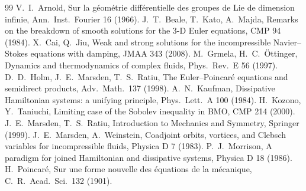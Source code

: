 \documentclass[11pt]{amsart}
\theoremstyle{definition}\newtheorem{definition}[theorem]{Definition}
\theoremstyle{remark}\newtheorem{remark}[theorem]{Remark}
\begin{document}
\begin{thebibliography}{99}
 V.~I.~Arnold, Sur la g\'eom\'etrie diff\'erentielle des groupes de Lie de dimension infinie, Ann.\ Inst.\ Fourier 16 (1966).
 J.~T.~Beale, T.~Kato, A.~Majda, Remarks on the breakdown of smooth solutions for the 3-D Euler equations, CMP 94 (1984).
 X.~Cai, Q.~Jiu, Weak and strong solutions for the incompressible Navier--Stokes equations with damping, JMAA 343 (2008).
 M.~Grmela, H.~C.~\"Ottinger, Dynamics and thermodynamics of complex fluids, Phys.\ Rev.\ E 56 (1997).
 D.~D.~Holm, J.~E.~Marsden, T.~S.~Ratiu, The Euler--Poincar\'e equations and semidirect products, Adv.\ Math.\ 137 (1998).
 A.~N.~Kaufman, Dissipative Hamiltonian systems: a unifying principle, Phys.\ Lett.\ A 100 (1984).
 H.~Kozono, Y.~Taniuchi, Limiting case of the Sobolev inequality in BMO, CMP 214 (2000).
 J.~E.~Marsden, T.~S.~Ratiu, Introduction to Mechanics and Symmetry, Springer (1999).
 J.~E.~Marsden, A.~Weinstein, Coadjoint orbits, vortices, and Clebsch variables for incompressible fluids, Physica D 7 (1983).
 P.~J.~Morrison, A paradigm for joined Hamiltonian and dissipative systems, Physica D 18 (1986).
 H.~Poincar\'e, Sur une forme nouvelle des \'equations de la m\'ecanique, C.~R.\ Acad.\ Sci.\ 132 (1901).
\end{thebibliography}
\end{document}
